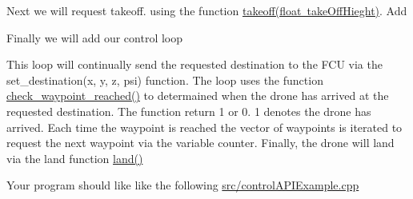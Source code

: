 Next we will request takeoff. using the function {\ttfamily \mbox{\hyperlink{group__control__functions_gac0aa671c99c09687515ec5bb8891c7d2}{takeoff(float take\+Off\+Hieght)}}}. Add 
\begin{DoxyCode}{0}
\end{DoxyCode}


Finally we will add our control loop 
\begin{DoxyCode}{0}
\DoxyCodeLine{    \{}
\DoxyCodeLine{        \{}
\DoxyCodeLine{            \{}
\DoxyCodeLine{            \}   }
\DoxyCodeLine{        \}   }
\DoxyCodeLine{        }
\DoxyCodeLine{    \}}
\DoxyCodeLine{\}}
\end{DoxyCode}
 This loop will continually send the requested destination to the F\+CU via the {\ttfamily set\+\_\+destination(x, y, z, psi)} function. The loop uses the function {\ttfamily \mbox{\hyperlink{group__control__functions_ga54abc3f6eae022a8710bc0c2e1c54fbe}{check\+\_\+waypoint\+\_\+reached()}}} to determained when the drone has arrived at the requested destination. The function return 1 or 0. 1 denotes the drone has arrived. Each time the waypoint is reached the vector of waypoints is iterated to request the next waypoint via the variable {\ttfamily counter}. Finally, the drone will land via the land function {\ttfamily \mbox{\hyperlink{group__control__functions_ga52a11a139e56315de52d2ab439b0d203}{land()}}}

Your program should like like the following \mbox{\hyperlink{controlAPIExample_8cpp}{src/control\+A\+P\+I\+Example.\+cpp}}


